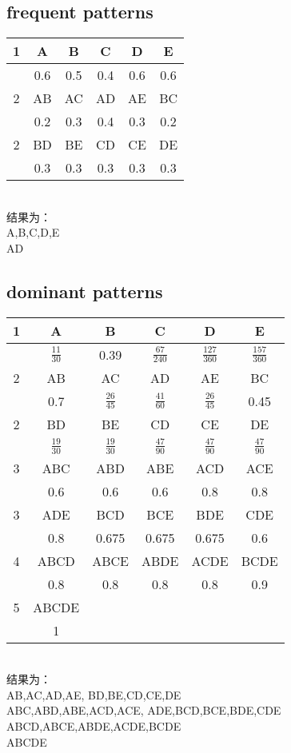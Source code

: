 \documentclass{article}
\begin{document}
		\subsection{frequent patterns}
		\begin{center}
			\begin{tabular}{|c||c|c|c|c|c|}
				\hline
				1 & A & B & C & D & E\\
				\hline
				  & 0.6 & 0.5 & 0.4 & 0.6 & 0.6\\
				\hline
				2 & AB & AC & AD & AE & BC\\
				\hline
				  & 0.2 & 0.3 & 0.4 & 0.3 & 0.2\\
				\hline
				2 & BD & BE & CD & CE & DE\\
				\hline
	   			  & 0.3 & 0.3 & 0.3 & 0.3 & 0.3\\
				\hline
			\end{tabular}\\[1em]
		结果为：\\
		A,B,C,D,E\\
		AD
		\end{center}
		\subsection{dominant patterns}
				\begin{center}
			\begin{tabular}{|c||c|c|c|c|c|}
				\hline
				1 & A & B & C & D & E\\
				\hline
				  & $\frac{11}{30}$ & 0.39 & $\frac{67}{240}$ & $\frac{127}{360}$ & $\frac{157}{360}$\\
				\hline
				2 & AB & AC & AD & AE & BC\\
				\hline
				  & 0.7 & $\frac{26}{45}$ & $\frac{41}{60}$ & $\frac{26}{45}$ & 0.45\\
				\hline
				2 & BD & BE & CD & CE & DE\\
				\hline
				  & $\frac{19}{30}$ & $\frac{19}{30}$ & $\frac{47}{90}$ & $\frac{47}{90}$ & $\frac{47}{90}$\\
				\hline
				3 & ABC & ABD & ABE & ACD & ACE\\
				\hline
				  & 0.6 & 0.6 & 0.6 & 0.8 & 0.8\\
				\hline
				3 & ADE & BCD & BCE & BDE & CDE\\
				\hline
				  & 0.8 & 0.675 & 0.675 & 0.675 & 0.6\\
				\hline
				4 & ABCD & ABCE & ABDE & ACDE & BCDE\\
				\hline
				  & 0.8 & 0.8 & 0.8 & 0.8 & 0.9\\
				\hline
				5 & ABCDE & & & &\\
				\hline
				& 1 & & & &\\
				\hline
			\end{tabular}\\[1em]
			结果为：\\
			AB,AC,AD,AE,
			BD,BE,CD,CE,DE\\
			ABC,ABD,ABE,ACD,ACE,
			ADE,BCD,BCE,BDE,CDE\\
			ABCD,ABCE,ABDE,ACDE,BCDE\\
			ABCDE
		\end{center}
\end{document}
